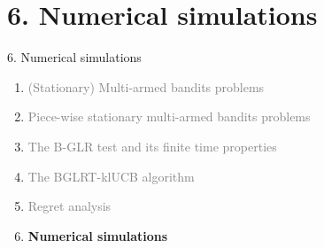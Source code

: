 \documentclass[11pt,english,ignorenonframetext,]{beamer}
\begin{document}
\section{\hfill{}6. Numerical simulations\hfill{}}

\begin{frame}{6. Numerical simulations}

  \begin{enumerate}
    \item
    \textcolor{gray}{
      (Stationary) Multi-armed bandits problems
    }
    \vspace*{15pt}

    \item
    \textcolor{gray}{
      Piece-wise stationary multi-armed bandits problems
    }
    \vspace*{15pt}

    \item
    \textcolor{gray}{
      The B-GLR test and its finite time properties
    }
    \vspace*{15pt}

    \item
    \textcolor{gray}{
      The BGLRT-klUCB algorithm
    }
    \vspace*{15pt}

    \item
    \textcolor{gray}{
      Regret analysis
    }
    \vspace*{15pt}

    \item
    \alert{\textbf{%
      Numerical simulations
    }}
  \end{enumerate}

\end{frame}
\end{document}
